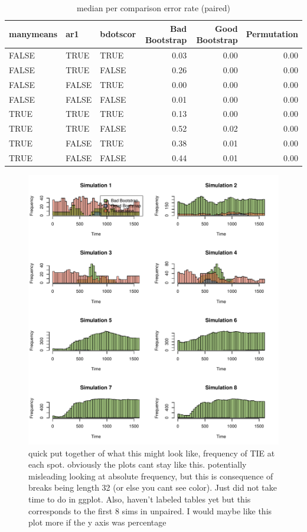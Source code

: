 \documentclass{article}
\begin{document}
\begin{table}[H]
\centering
\begin{tabular}{lllrrr}
  \hline
  manymeans & ar1 & bdotscor &  Bad Bootstrap & Good Bootstrap & Permutation  \\ 
  \hline
FALSE & TRUE & TRUE & 0.03 & 0.00 & 0.00 \\ 
  FALSE & TRUE & FALSE & 0.26 & 0.00 & 0.00 \\ 
  FALSE & FALSE & TRUE & 0.00 & 0.00 & 0.00 \\ 
  FALSE & FALSE & FALSE & 0.01 & 0.00 & 0.00 \\ 
  TRUE & TRUE & TRUE & 0.13 & 0.00 & 0.00 \\ 
  TRUE & TRUE & FALSE & 0.52 & 0.02 & 0.00 \\ 
  TRUE & FALSE & TRUE & 0.38 & 0.01 & 0.00 \\ 
  TRUE & FALSE & FALSE & 0.44 & 0.01 & 0.00 \\ 
   \hline
\end{tabular}
\caption{median per comparison error rate (paired)}
\end{table}

\begin{figure}[H]
\centering
\includegraphics{TEMP_histogram.pdf}
\caption{quick put together of what this might look like, frequency of TIE at each spot. obviously the plots cant stay like this. potentially misleading looking at absolute frequency, but this is consequence of breaks being length 32 (or else you cant see color). Just did not take time to do in ggplot. Also, haven't labeled tables yet but this corresponds to the first 8 sims in unpaired. I would maybe like this plot more if the y axis was percentage}
\end{figure}
\end{document}
